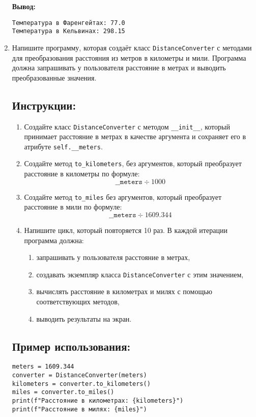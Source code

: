 \begin{enumerate}
\textbf{Вывод:}
\begin{verbatim}
Температура в Фаренгейтах: 77.0
Температура в Кельвинах: 298.15
\end{verbatim}

\item
Напишите программу, которая создаёт класс \texttt{DistanceConverter} с методами для преобразования расстояния
из метров в километры и мили. Программа должна запрашивать у пользователя расстояние в метрах
и выводить преобразованные значения.

\subsection*{Инструкции:}
\begin{enumerate}
\item Создайте класс \texttt{DistanceConverter} с методом
\texttt{\_\_init\_\_}, который принимает расстояние в метрах в
качестве аргумента и сохраняет его в атрибуте \texttt{self.\_\_meters}.

\item Создайте метод \texttt{to\_kilometers},
без аргументов, который преобразует расстояние в километры по формуле:
\[
\texttt{\_\_meters} \div 1000
\]

\item Создайте метод \texttt{to\_miles} без аргументов,
который преобразует расстояние в мили по формуле:
\[
\texttt{\_\_meters} \div 1609.344
\]

\item Напишите цикл, который повторяется 10 раз. В каждой итерации программа должна:
\begin{enumerate}
\item запрашивать у пользователя расстояние в метрах,
\item создавать экземпляр класса \texttt{DistanceConverter} с этим значением,
\item вычислять расстояние в километрах и милях с помощью соответствующих методов,
\item выводить результаты на экран.
\end{enumerate}
\end{enumerate}

\subsection*{Пример использования:}
\begin{verbatim}
meters = 1609.344
converter = DistanceConverter(meters)
kilometers = converter.to_kilometers()
miles = converter.to_miles()
print(f"Расстояние в километрах: {kilometers}")
print(f"Расстояние в милях: {miles}")
\end{verbatim}


\end{enumerate}
